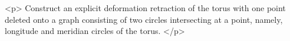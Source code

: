 <p>
    Construct an explicit deformation retraction of the torus with one point deleted onto a graph consisting of two
    circles intersecting at a point, namely, longitude and meridian circles of the torus.
</p>